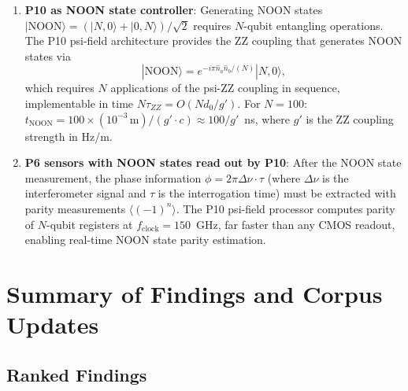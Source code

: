 \documentclass[11pt]{article}
\theoremstyle{definition}
\theoremstyle{remark}
\begin{document}
\begin{enumerate}
\item \textbf{P10 as NOON state controller}: Generating NOON states
  $|\mathrm{NOON}\rangle = (|N,0\rangle + |0,N\rangle)/\sqrt{2}$ requires
  $N$-qubit entangling operations. The P10 psi-field architecture provides
  the ZZ coupling that generates NOON states via
  \begin{equation}
  |\mathrm{NOON}\rangle = e^{-i\pi\hat{n}_a\hat{n}_b/(N)} |N,0\rangle,
  \label{eq:noon_gen}
  \end{equation}
  which requires $N$ applications of the psi-ZZ coupling in sequence,
  implementable in time $N\tau_{ZZ} = O(N d_0/g')$. For $N = 100$:
  $t_{\mathrm{NOON}} = 100\times(10^{-3}\,\mathrm{m})/(g'\cdot c)
  \approx 100/g'$~ns, where $g'$ is the ZZ coupling strength in Hz/m.

\item \textbf{P6 sensors with NOON states read out by P10}:
  After the NOON state measurement, the phase information
  $\phi = 2\pi\Delta\nu\cdot\tau$ (where $\Delta\nu$ is the interferometer
  signal and $\tau$ is the interrogation time) must be extracted with
  parity measurements $\langle(-1)^n\rangle$. The P10 psi-field processor
  computes parity of $N$-qubit registers at $f_{\mathrm{clock}} = 150$~GHz,
  far faster than any CMOS readout, enabling real-time NOON state parity
  estimation.
\end{enumerate}

\section{Summary of Findings and Corpus Updates}
\label{sec:summary}

\subsection{Ranked Findings}
\end{document}

